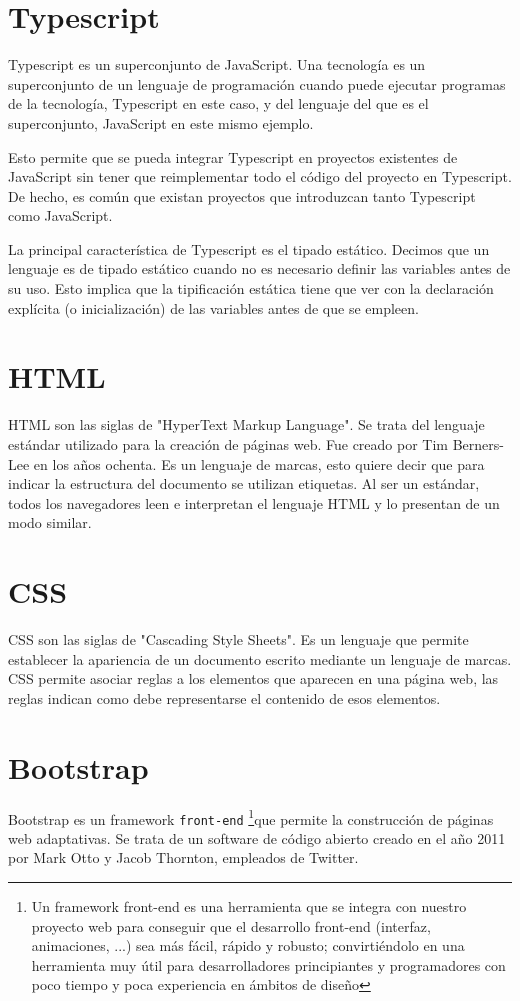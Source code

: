 \documentclass[a4paper, 12pt]{book}
\begin{document}
\section{Typescript}
\label{sec:Typescript}
Typescript es un superconjunto de JavaScript. Una tecnología es un superconjunto de un lenguaje de programación cuando puede ejecutar programas de la tecnología, Typescript en este caso, y del lenguaje del que es el superconjunto, JavaScript en este mismo ejemplo.

	Esto permite que se pueda integrar Typescript en proyectos existentes de JavaScript sin tener que reimplementar todo el código del proyecto en Typescript. De hecho, es común que existan proyectos que introduzcan tanto Typescript como JavaScript.
	
	La principal característica de Typescript es el tipado estático. Decimos que un lenguaje es de tipado estático cuando no es necesario definir las variables antes de su uso. Esto implica que la tipificación estática tiene que ver con la declaración explícita (o inicialización) de las variables antes de que se empleen.


\section{HTML}
\label{sec:HTML}
HTML son las siglas de "HyperText Markup Language". Se trata del lenguaje estándar utilizado para la creación de páginas web. Fue creado por Tim Berners-Lee en los años ochenta. Es un lenguaje de marcas, esto quiere decir que para indicar la estructura del documento se utilizan etiquetas. Al ser un estándar, todos los navegadores leen e interpretan el lenguaje HTML y lo presentan de un modo similar.

\clearpage

\section{CSS}
\label{sec:CSS}
CSS son las siglas de "Cascading Style Sheets". Es un lenguaje que permite establecer la apariencia de un documento escrito mediante un lenguaje de marcas. CSS permite asociar reglas a los elementos que aparecen en una página web, las reglas indican como debe representarse el contenido de esos elementos.

\section{Bootstrap}
\label{sec:Bootstrap}
Bootstrap es un framework \texttt{front-end} 
\footnote{Un framework front-end es una herramienta que se integra con nuestro proyecto web para conseguir que el desarrollo front-end (interfaz, animaciones, ...) sea más fácil, rápido y robusto; convirtiéndolo en una herramienta muy útil para desarrolladores principiantes y programadores con poco tiempo y poca experiencia en ámbitos de diseño}que permite la construcción de páginas web adaptativas. Se trata de un software de código abierto creado en el año 2011 por Mark Otto y Jacob Thornton, empleados de Twitter.
\end{document}
